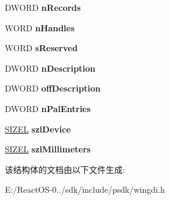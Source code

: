 \begin{DoxyCompactItemize}
D\+W\+O\+RD {\bfseries n\+Records}
\item 
\mbox{\label{structtag_e_n_h_m_e_t_a_h_e_a_d_e_r_a18f03c9e172b87d4672d86d59a77180b}} 
W\+O\+RD {\bfseries n\+Handles}
\item 
\mbox{\label{structtag_e_n_h_m_e_t_a_h_e_a_d_e_r_ae9e7f40be75dd3cb4b397517244a1e45}} 
W\+O\+RD {\bfseries s\+Reserved}
\item 
\mbox{\label{structtag_e_n_h_m_e_t_a_h_e_a_d_e_r_a94d966efc7c8846de77dc0862e454f4e}} 
D\+W\+O\+RD {\bfseries n\+Description}
\item 
\mbox{\label{structtag_e_n_h_m_e_t_a_h_e_a_d_e_r_adf60d83e02136407de1e43b0ea2f361a}} 
D\+W\+O\+RD {\bfseries off\+Description}
\item 
\mbox{\label{structtag_e_n_h_m_e_t_a_h_e_a_d_e_r_acd1720137243b92e97a73cfe6e234fcf}} 
D\+W\+O\+RD {\bfseries n\+Pal\+Entries}
\item 
\mbox{\label{structtag_e_n_h_m_e_t_a_h_e_a_d_e_r_a802f332f10ed6ae5610157371cb000f9}} 
\hyperlink{structtag_s_i_z_e}{S\+I\+Z\+EL} {\bfseries szl\+Device}
\item 
\mbox{\label{structtag_e_n_h_m_e_t_a_h_e_a_d_e_r_ac0ad93b2a0b0768d97d8b168ff54943e}} 
\hyperlink{structtag_s_i_z_e}{S\+I\+Z\+EL} {\bfseries szl\+Millimeters}
\end{DoxyCompactItemize}


该结构体的文档由以下文件生成\+:\begin{DoxyCompactItemize}
\item 
E\+:/\+React\+O\+S-\/0../sdk/include/psdk/wingdi.\+h\end{DoxyCompactItemize}
